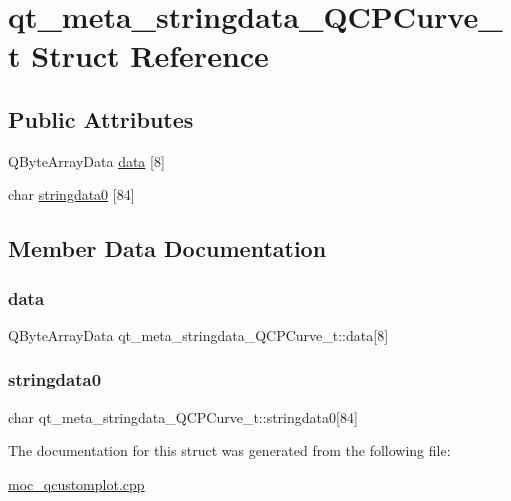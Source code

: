 \hypertarget{structqt__meta__stringdata__QCPCurve__t}{}\section{qt\+\_\+meta\+\_\+stringdata\+\_\+\+Q\+C\+P\+Curve\+\_\+t Struct Reference}
\label{structqt__meta__stringdata__QCPCurve__t}
\subsection*{Public Attributes}
\begin{DoxyCompactItemize}
\item 
Q\+Byte\+Array\+Data \mbox{\hyperlink{structqt__meta__stringdata__QCPCurve__t_a7398cd60d68a5b116f4a9337e17df11d}{data}} \mbox{[}8\mbox{]}
\item 
char \mbox{\hyperlink{structqt__meta__stringdata__QCPCurve__t_a48e3deecb80ff42a459075e2246e712f}{stringdata0}} \mbox{[}84\mbox{]}
\end{DoxyCompactItemize}


\subsection{Member Data Documentation}
\mbox{\label{structqt__meta__stringdata__QCPCurve__t_a7398cd60d68a5b116f4a9337e17df11d}} 
\subsubsection{\texorpdfstring{data}{data}}
{\footnotesize\ttfamily Q\+Byte\+Array\+Data qt\+\_\+meta\+\_\+stringdata\+\_\+\+Q\+C\+P\+Curve\+\_\+t\+::data\mbox{[}8\mbox{]}}

\mbox{\label{structqt__meta__stringdata__QCPCurve__t_a48e3deecb80ff42a459075e2246e712f}} 
\subsubsection{\texorpdfstring{stringdata0}{stringdata0}}
{\footnotesize\ttfamily char qt\+\_\+meta\+\_\+stringdata\+\_\+\+Q\+C\+P\+Curve\+\_\+t\+::stringdata0\mbox{[}84\mbox{]}}



The documentation for this struct was generated from the following file\+:\begin{DoxyCompactItemize}
\item 
\mbox{\hyperlink{moc__qcustomplot_8cpp}{moc\+\_\+qcustomplot.\+cpp}}\end{DoxyCompactItemize}
